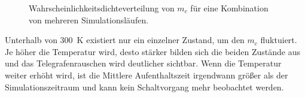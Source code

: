 \documentclass[main.tex]{subfiles}
\begin{document}
\begin{figure}[H]
    \centering
    \caption{Wahrscheinlichkeitsdichteverteilung von \(m_c\) für eine Kombination von mehreren Simulationsläufen.}\label{fig:temp-hist}    
\end{figure}

Unterhalb von \SI{300}{\kelvin} existiert nur ein einzelner Zustand, um den \(m_c\) fluktuiert. Je höher die Temperatur wird, desto stärker bilden sich die beiden Zustände aus und das Telegrafenrauschen wird deutlicher sichtbar. Wenn die Temperatur weiter erhöht wird, ist die Mittlere Aufenthaltszeit irgendwann größer als der Simulationszeitraum und kann kein Schaltvorgang mehr beobachtet werden.
\end{document}
